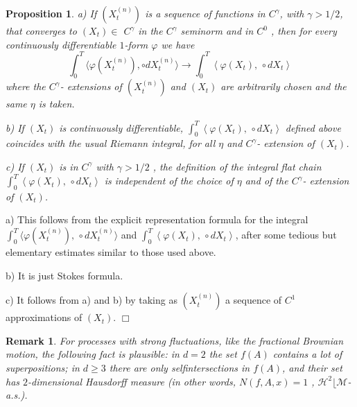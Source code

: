 \documentclass{article}
\newtheorem{proposition}[theorem]{Proposition}
\newtheorem{remark}[theorem]{Remark}
\newenvironment{proof}[1][Proof]{{\sc #1.} }{\hfill $\Box$}
\begin{document}
\begin{proposition}
\label{th:prop_key2}
a) If $( X_{t}^{\left( n\right) } ) $ is a sequence of functions
in $C^{\gamma }$, with $\gamma >1/2$, that converges to $\left(
X_{t}\right) \in $ $C^{\gamma }$ in the $C^{\gamma }$ seminorm and in $C^{0}$%
, then for every continuously differentiable $1$-form $\varphi $ we have 
\begin{equation*}
\int_{0}^{T}\langle \varphi ( X_{t}^{\left( n\right) } )
, \circ dX_{t}^{\left( n\right) }\rangle \rightarrow
\int_{0}^{T}\left\langle \varphi \left( X_{t}\right) ,\,\circ
dX_{t}\right\rangle 
\end{equation*}
where the $C^{\gamma }$- extensions of $( X_{t}^{\left( n\right)
}) $ and $\left( X_{t}\right) $ are arbitrarily chosen and the same $%
\eta $ is taken.

b) If $\left( X_{t}\right) $ is continuously differentiable, $%
\int_{0}^{T}\left\langle \varphi \left( X_{t}\right) ,\,\circ
dX_{t}\right\rangle $ defined above coincides with the usual Riemann
integral, for all $\eta $ and $C^{\gamma }$- extension of $\left(
X_{t}\right) $.

c) If $\left( X_{t}\right) $ is in $C^{\gamma }$ with $\gamma >1/2$%
, the definition of the integral flat chain $\int_{0}^{T}\left\langle
\varphi \left( X_{t}\right) ,\,\circ dX_{t}\right\rangle $ is independent of 
the choice of $\eta $ and of the $C^{\gamma }$- extension of $\left( X_{t}\right) $.
\end{proposition}
%
\begin{proof}
a) This follows from the explicit representation formula for the
integral $%
\int_{0}^{T}\langle \varphi( X_{t}^{\left( n\right) })
,\,\circ dX_{t}^{\left( n\right) }\rangle $ and $\int_{0}^{T}\left%
\langle \varphi \left( X_{t}\right) ,\,\circ dX_{t}\right\rangle $, after
some tedious but elementary estimates similar to those used above.

b) It is just Stokes formula.

c) It follows from a) and b) by taking as $( X_{t}^{\left( n\right)
}) $ a sequence of $C^{1}$ approximations of $\left( X_{t}\right) $.
\end{proof}

\begin{remark}
For processes with strong fluctuations, like the fractional Brownian motion,
the following fact is plausible: in $d=2$ the set $f(A)$ contains a lot of
superpositions; in $d\geq 3$ there are only selfintersections in $f(A)$, and
their set has $2$-dimensional Hausdorff measure (in other words, $N(f,A,x)=1$%
, $\mathcal{H}^{2}\lfloor \mathcal{M}$-a.s.).
\end{remark}
\end{document}
